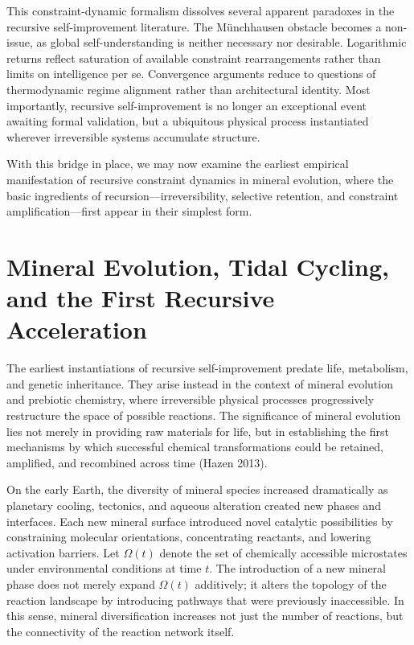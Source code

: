 \documentclass[11pt]{article}
\begin{document}
This constraint-dynamic formalism dissolves several apparent paradoxes in the recursive self-improvement literature. The Münchhausen obstacle becomes a non-issue, as global self-understanding is neither necessary nor desirable. Logarithmic returns reflect saturation of available constraint rearrangements rather than limits on intelligence per se. Convergence arguments reduce to questions of thermodynamic regime alignment rather than architectural identity. Most importantly, recursive self-improvement is no longer an exceptional event awaiting formal validation, but a ubiquitous physical process instantiated wherever irreversible systems accumulate structure.

With this bridge in place, we may now examine the earliest empirical manifestation of recursive constraint dynamics in mineral evolution, where the basic ingredients of recursion—irreversibility, selective retention, and constraint amplification—first appear in their simplest form.

\section{Mineral Evolution, Tidal Cycling, and the First Recursive Acceleration}

The earliest instantiations of recursive self-improvement predate life, metabolism, and genetic inheritance. They arise instead in the context of mineral evolution and prebiotic chemistry, where irreversible physical processes progressively restructure the space of possible reactions. The significance of mineral evolution lies not merely in providing raw materials for life, but in establishing the first mechanisms by which successful chemical transformations could be retained, amplified, and recombined across time (Hazen 2013).

On the early Earth, the diversity of mineral species increased dramatically as planetary cooling, tectonics, and aqueous alteration created new phases and interfaces. Each new mineral surface introduced novel catalytic possibilities by constraining molecular orientations, concentrating reactants, and lowering activation barriers. Let $\Omega(t)$ denote the set of chemically accessible microstates under environmental conditions at time $t$. The introduction of a new mineral phase does not merely expand $\Omega(t)$ additively; it alters the topology of the reaction landscape by introducing pathways that were previously inaccessible. In this sense, mineral diversification increases not just the number of reactions, but the connectivity of the reaction network itself.
\end{document}
